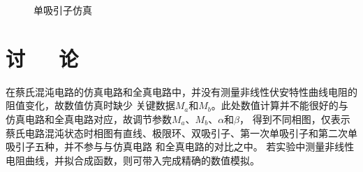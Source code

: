 \documentclass[10pt,a4paper,twoside,UTF8]{ctexart}
\begin{document}
\begin{figure}[H]
	\centering

	\caption{单吸引子仿真}
	\label{fig:lorenz_1}
\end{figure}

\section{讨~~~论}
在蔡氏混沌电路的仿真电路和全真电路中，并没有测量非线性伏安特性曲线电阻的阻值变化，故数值仿真时缺少
关键数据$M_a$和$M_b$。此处数值计算并不能很好的与仿真电路和全真电路对应，故调节参数$M_a$、$M_b$、$\alpha$和$\beta$，
得到不同相图，仅表示蔡氏电路混沌状态时相图有直线、极限环、双吸引子、第一次单吸引子和第二次单吸引子五种，并不参与与仿真电路 和全真电路的对比之中。
若实验中测量非线性电阻曲线，并拟合成函数，则可带入完成精确的数值模拟。
\end{document}
